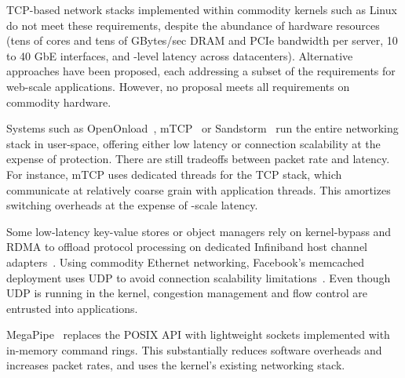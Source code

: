 TCP-based network stacks implemented within commodity kernels such as
Linux do not meet these requirements, despite the abundance of hardware
resources (tens of cores and tens of GBytes/sec DRAM and PCIe
bandwidth per server, 10 to 40 GbE interfaces, and \microsecond-level
latency across datacenters).
Alternative approaches have been proposed, each addressing a subset of
the requirements for web-scale applications. However, no
proposal meets all requirements on commodity hardware. 

 Systems such as
OpenOnload~\cite{openonload}, mTCP~\cite{jeong2014mtcp} or Sandstorm~\cite{marinos2013network} run the
entire networking stack in user-space, offering either low latency or connection scalability at the expense of
protection. There are still tradeoffs between packet rate and
latency. For instance, mTCP uses dedicated threads for the TCP
stack, which communicate at relatively coarse grain with application
threads. This amortizes switching overheads at the
expense of \microsecond-scale latency.

 Some low-latency key-value stores or object managers rely on
kernel-bypass and RDMA to offload protocol processing on dedicated
Infiniband host channel
adapters~\cite{DBLP:conf/sosp/OngaroRSOR11,Jose:2011:MDH,mitchell:rdma,dragojevic14farm}.  Using
commodity Ethernet networking, Facebook's memcached deployment uses
UDP to avoid connection scalability
limitations~\cite{nishtala2013scaling}. Even though UDP is running in
the kernel, congestion management and flow control are entrusted into
applications.

 MegaPipe~\cite{han2012megapipe}
replaces the POSIX API with lightweight sockets implemented with
in-memory command rings. This substantially reduces software overheads
and increases packet rates, and uses the kernel's existing networking stack.


